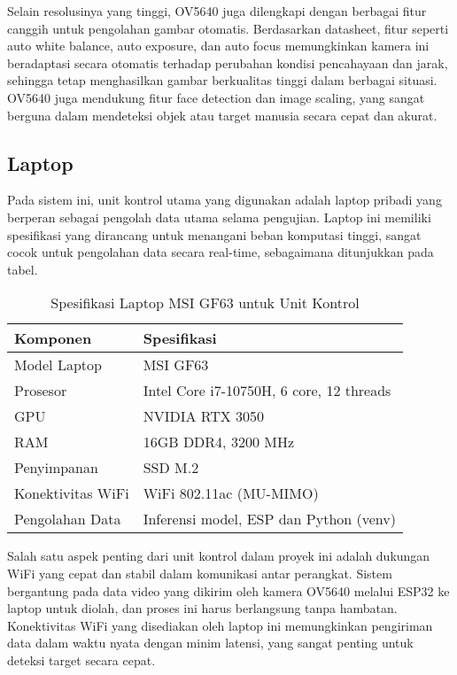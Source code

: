 Selain resolusinya yang tinggi, OV5640 juga dilengkapi dengan berbagai fitur canggih untuk pengolahan gambar otomatis. Berdasarkan datasheet, fitur seperti auto white balance, auto exposure, dan auto focus memungkinkan kamera ini beradaptasi secara otomatis terhadap perubahan kondisi pencahayaan dan jarak, sehingga tetap menghasilkan gambar berkualitas tinggi dalam berbagai situasi. OV5640 juga mendukung fitur face detection dan image scaling, yang sangat berguna dalam mendeteksi objek atau target manusia secara cepat dan akurat.

\subsection{Laptop}
\label{subsec:laptop}
Pada sistem ini, unit kontrol utama yang digunakan adalah laptop pribadi yang berperan sebagai pengolah data utama selama pengujian. Laptop ini memiliki spesifikasi yang dirancang untuk menangani beban komputasi tinggi, sangat cocok untuk pengolahan data secara real-time, sebagaimana ditunjukkan pada tabel.

\begin{table}[H]
  \centering
  \caption{Spesifikasi Laptop MSI GF63 untuk Unit Kontrol}
  \begin{tabular}{|l|l|}
  \hline
  \textbf{Komponen}       & \textbf{Spesifikasi}                     \\ \hline
  Model Laptop            & MSI GF63                                 \\ \hline
  Prosesor                & Intel Core i7-10750H, 6 core, 12 threads \\ \hline
  GPU                     & NVIDIA RTX 3050                          \\ \hline
  RAM                     & 16GB DDR4, 3200 MHz                      \\ \hline
  Penyimpanan             & SSD M.2                                  \\ \hline
  Konektivitas WiFi       & WiFi 802.11ac (MU-MIMO)                  \\ \hline
  Pengolahan Data         & Inferensi model, ESP dan Python (venv)   \\ \hline
  \end{tabular}
\end{table}

Salah satu aspek penting dari unit kontrol dalam proyek ini adalah dukungan WiFi yang cepat dan stabil dalam komunikasi antar perangkat. Sistem bergantung pada data video yang dikirim oleh kamera OV5640 melalui ESP32 ke laptop untuk diolah, dan proses ini harus berlangsung tanpa hambatan. Konektivitas WiFi yang disediakan oleh laptop ini memungkinkan pengiriman data dalam waktu nyata dengan minim latensi, yang sangat penting untuk deteksi target secara cepat.

